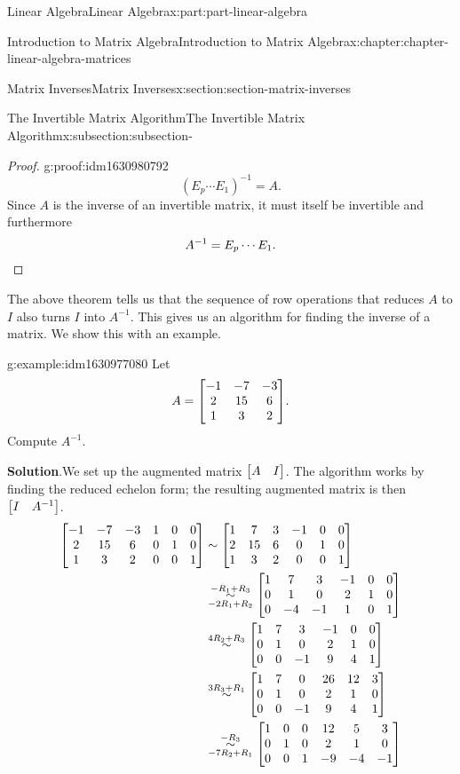 \documentclass[twoside,10pt,]{book}
\newcommand{\blocktitlefont}{\relax}
\numberwithin{equation}{part}
\newcommand{\qedhere}{\relax}
\newcommand{\rowop}[2][]{\overset{#2}{\underset{#1}{\sim}}}
\begin{document}
\begin{partptx}{Linear Algebra}{}{Linear Algebra}{}{}{x:part:part-linear-algebra}
\begin{chapterptx}{Introduction to Matrix Algebra}{}{Introduction to Matrix Algebra}{}{}{x:chapter:chapter-linear-algebra-matrices}
\begin{sectionptx}{Matrix Inverses}{}{Matrix Inverses}{}{}{x:section:section-matrix-inverses}
\begin{subsectionptx}{The Invertible Matrix Algorithm}{}{The Invertible Matrix Algorithm}{}{}{x:subsection:subsection-}
\begin{proof}{}{g:proof:idm1630980792}
\begin{equation*}
(E_{p}\cdots E_{1})^{-1} = A.
\end{equation*}
Since \(A\) is the inverse of an invertible matrix, it must itself be invertible and furthermore%
\begin{equation*}
A^{-1} = E_{p}\cdots E_{1}.\qedhere
\end{equation*}
%
\end{proof}
The above theorem tells us that the sequence of row operations that reduces \(A\) to \(I\) also turns \(I\) into \(A^{-1}\). This gives us an algorithm for finding the inverse of a matrix. We show this with an example.%
\begin{example}{}{g:example:idm1630977080}%
Let%
\begin{equation*}
A = \mqty[-1 & -7 & -3 \\ 2 & 15 & 6 \\ 1 & 3 & 2].
\end{equation*}
Compute \(A^{-1}\).%
\par\smallskip%
\noindent\textbf{\blocktitlefont Solution}.\hypertarget{g:solution:idm1630981048}{}\quad{}We set up the augmented matrix \(\mqty[A& I]\). The algorithm works by finding the reduced echelon form; the resulting augmented matrix is then \(\mqty[I& A^{-1}]\).%
\begin{align*}
\mqty[-1 & -7 & -3 & 1 & 0 & 0 \\ 2 & 15 & 6 & 0 & 1 & 0 \\ 1 & 3 & 2 & 0 & 0 & 1] &\sim\mqty[1 & 7 & 3 & -1 & 0 & 0 \\ 2 & 15 & 6 & 0 & 1 & 0 \\ 1 & 3 & 2 & 0 & 0 & 1]\\
&\rowop[-2R_{1}+R_{2}]{-R_{1}+R_{3}}\mqty[1 & 7 & 3 & -1 & 0 & 0 \\ 0 & 1 & 0 & 2 & 1 & 0 \\ 0 & -4 & -1 & 1 & 0 & 1]\\
&\rowop{4R_{2}+R_{3}}\mqty[1 & 7 & 3 & -1 & 0 & 0 \\ 0 & 1 & 0 & 2 & 1 & 0 \\ 0 & 0 & -1 & 9 & 4 & 1]\\
&\rowop{3R_{3}+R_{1}}\mqty[1 & 7 & 0 & 26 & 12 & 3 \\ 0 & 1 & 0 & 2 & 1 & 0 \\ 0 & 0 & -1 & 9 & 4 & 1]\\
&\rowop[-7R_{2}+R_{1}]{-R_{3}}\mqty[1 & 0 & 0 & 12 & 5 & 3 \\ 0 & 1 & 0 & 2 & 1 & 0 \\ 0 & 0 & 1 & -9 & -4 & -1]

\end{align*}
\end{example}
\end{subsectionptx}
\end{sectionptx}
\end{chapterptx}
\end{partptx}
\end{document}
